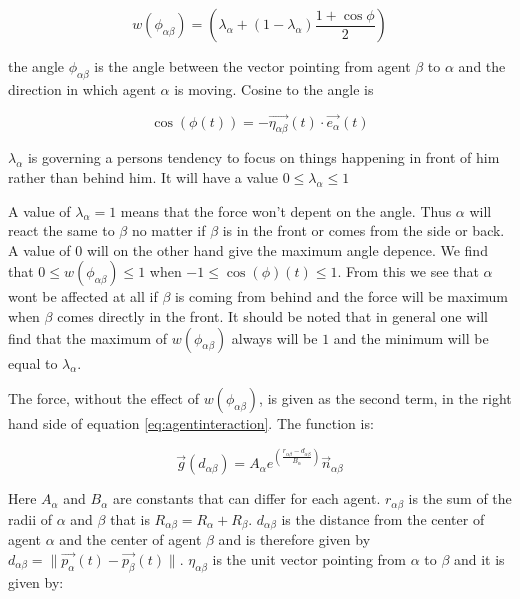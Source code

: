 \begin{equation}
    w\left(\phi_{\alpha \beta}\right)=
    \left(
        \lambda_{\alpha} + \left(
            1 - \lambda_{\alpha}
        \right)
		\frac{1+\cos{\phi}}{2}
    \right) 
    \label{angleAB}
\end{equation}

the angle $\phi_{\alpha \beta}$ is the angle between the 
vector pointing from agent $\beta$ to $\alpha$ and the direction in which 
agent $\alpha$ is moving. Cosine to the angle is 

\begin{equation}
\cos \left( \phi \left( t \right) \right)
		= 
	- \vec{\eta_{\alpha \beta}}
		\left( t \right) 
	\cdot 
\vec{e_{\alpha}}\left( t \right)
\end{equation}

$\lambda_{\alpha}$ is governing a persons tendency to focus on things happening in front of him 
rather than behind him. It will have a value  $0\leq \lambda_{\alpha}\leq 1$

A value of $\lambda_{\alpha}=1$ means that the force won't depent on the angle. Thus $\alpha$ will react the same to $\beta$ no matter if $\beta$ is in the front or comes from the side or back. A value of $0$ will on the other hand give the maximum angle depence. We find that $0\leq w\left(\phi_{\alpha \beta}\right)\leq1$ when $-1 \leq \cos \left( \phi \right) \left( t \right) \leq 1$. From this we see that $\alpha$ wont be affected at all if $\beta$ is coming from behind and the force will be maximum when $\beta$ comes directly in the front. It should be noted that in general one will find that the maximum of $w\left(\phi_{\alpha \beta}\right)$ always will be $1$ and the minimum will be equal to $\lambda_{\alpha}$.   


The force, without the effect of $w\left(\phi_{\alpha \beta}\right)$, is given as the second term, in the right hand side of equation \ref{eq:agentinteraction}. The function is:  

\begin{equation}
	\vec{g} 
	\left(
	d_{\alpha \beta}
	\right)
	=
	 A_{\alpha} e^{ \left(\frac{ r_{\alpha \beta} - d_{\alpha \beta}}{B_{\alpha}}\right)}
	\vec{n}_{\alpha \beta}
	        \label{re}	
\end{equation}

Here $A_{\alpha}$ and $B_{\alpha}$ are constants that can differ for each agent. 
$r_{\alpha \beta}$ is the sum of the radii of $\alpha$ and $\beta$ that is 
$R_{\alpha \beta} = R_{\alpha} + R_{\beta}$. $d_{\alpha \beta}$ is the 
distance from the center of agent $\alpha$ and the center of 
agent $\beta$ and is therefore given by $d_{\alpha \beta} = 
\|\vec{p_{\alpha}}\left( t \right) - \vec{p_{\beta}}\left( t \right) \|$.
$\eta_{\alpha \beta}$ is the unit vector pointing from $\alpha$ to $\beta$ 
and it is given by:

